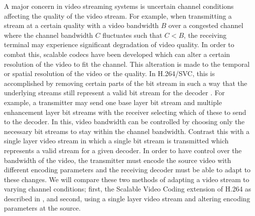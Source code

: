 \documentclass[preprint, 12pt]{elsarticle}
\begin{document}
A major concern in video streaming systems is uncertain channel conditions affecting the quality of the video stream. For example, when transmitting a stream at a certain quality with a video bandwidth $B$ over a congested channel where the channel bandwidth $C$ fluctuates such that $C < B$, the receiving terminal may experience significant degradation of video quality. In order to combat this, scalable codecs have been developed which can alter a certain resolution of the video to fit the channel. This alteration is made to the temporal or spatial resolution of the video or the quality. In H.264/SVC, this is accomplished by removing certain parts of the bit stream in such a way that the underlying streams still represent a valid bit stream for the decoder \cite{SVCOverview}. For example, a transmitter may send one base layer bit stream and multiple enhancement layer bit streams with the receiver selecting which of these to send to the decoder. In this, video bandwidth can be controlled by choosing only the necessary bit streams to stay within the channel bandwidth. Contrast this with a single layer video stream in which a single bit stream is transmitted which represents a valid stream for a given decoder. In order to have control over the bandwidth of the video, the transmitter must encode the source video with different encoding parameters and the receiving decoder must be able to adapt to these changes. We will compare these two methods of adapting a video stream to varying channel conditions; first, the Scalable Video Coding extension of H.264 as described in \cite{SVCOverview}, and second, using a single layer video stream and altering encoding parameters at the source. 
\end{document}
